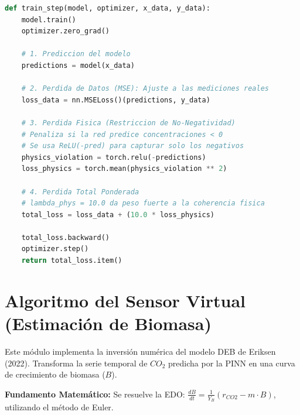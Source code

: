 \begin{lstlisting}[language=Python, caption=Entrenamiento con Restricción Física, frame=single, basicstyle=\small\ttfamily]
def train_step(model, optimizer, x_data, y_data):
    model.train()
    optimizer.zero_grad()
    
    # 1. Prediccion del modelo
    predictions = model(x_data)
    
    # 2. Perdida de Datos (MSE): Ajuste a las mediciones reales
    loss_data = nn.MSELoss()(predictions, y_data)
    
    # 3. Perdida Fisica (Restriccion de No-Negatividad)
    # Penaliza si la red predice concentraciones < 0
    # Se usa ReLU(-pred) para capturar solo los negativos
    physics_violation = torch.relu(-predictions) 
    loss_physics = torch.mean(physics_violation ** 2)
    
    # 4. Perdida Total Ponderada
    # lambda_phys = 10.0 da peso fuerte a la coherencia fisica
    total_loss = loss_data + (10.0 * loss_physics)
    
    total_loss.backward()
    optimizer.step()
    return total_loss.item()
\end{lstlisting}

\section{Algoritmo del Sensor Virtual (Estimación de Biomasa)}

Este módulo implementa la inversión numérica del modelo DEB de Eriksen (2022). Transforma la serie temporal de $CO_2$ predicha por la PINN en una curva de crecimiento de biomasa ($B$).

\textbf{Fundamento Matemático:}
Se resuelve la EDO: $\frac{dB}{dt} = \frac{1}{Y_B} (r_{CO2} - m \cdot B)$, utilizando el método de Euler.

